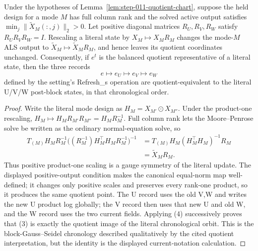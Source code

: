 \begin{proposition}\label{prop:step-011-refresh-equivariance}
Under the hypotheses of
Lemma~\ref{lem:step-011-quotient-chart}, suppose the held design for a mode
\(M\) has full column rank and the solved active output satisfies
\(\min_j\|\widetilde X_M(:,j)\|_2>0\). Let positive diagonal matrices
\(R_U,R_V,R_W\) satisfy \(R_UR_VR_W=I\). Rescaling a literal state by
\(X_M\mapsto X_MR_M\) changes the mode-\(M\) ALS output to
\(\widetilde X_M\mapsto\widetilde X_MR_M\), and hence leaves its quotient
coordinates unchanged. Consequently, if \(e^t\) is the balanced quotient
representative of a literal state, then the three records
\[
 e\longmapsto e_U\longmapsto e_V\longmapsto e_W
 \tag{3}
\]
defined by the setting's Refresh\_s operation are quotient-equivalent to
the literal U/V/W post-block states, in that chronological order.

\begin{proof}
Write the literal mode design as
\(H_M=X_{M'}\odot X_{M''}\). Under the product-one rescaling,
\(H_M\mapsto H_MR_{M'}R_{M''}=H_MR_M^{-1}\). Full column rank lets the
Moore--Penrose solve be written as the ordinary normal-equation solve, so
\[
\begin{aligned}
T_{(M)}H_MR_M^{-1}
 \big((R_M^{-1})H_M^\top H_MR_M^{-1}\big)^{-1}
 &=T_{(M)}H_M(H_M^\top H_M)^{-1}R_M\\
 &=\widetilde X_MR_M.
\end{aligned}
\tag{4}
\]
Thus positive product-one scaling is a gauge symmetry of the literal update.
The displayed positive-output condition makes the canonical equal-norm map
well-defined; it changes only positive scales and preserves every rank-one
product, so it produces the same quotient point. The U record uses
the old V,W and writes the new U product log globally; the V record then uses
that new U and old W, and the W record uses the two current fields. Applying
(4) successively proves that (3) is exactly the quotient image of the
literal chronological orbit. This is the block-Gauss--Seidel chronology
described qualitatively by the cited quotient interpretation, but the identity is
the displayed current-notation calculation.


\end{proof}
\end{proposition}
